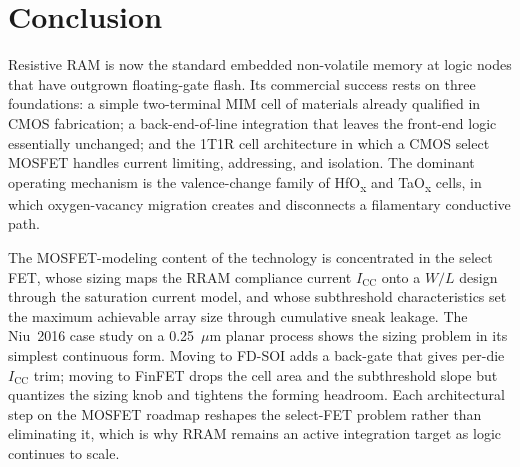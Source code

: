 \documentclass[lettersize,journal]{IEEEtran}
\begin{document}
\section{Conclusion}\label{sec:conclusion}
Resistive RAM is now the standard embedded non-volatile memory at logic nodes that have outgrown floating-gate flash. Its commercial success rests on three foundations: a simple two-terminal MIM cell of materials already qualified in CMOS fabrication; a back-end-of-line integration that leaves the front-end logic essentially unchanged; and the 1T1R cell architecture in which a CMOS select MOSFET handles current limiting, addressing, and isolation. The dominant operating mechanism is the valence-change family of HfO\textsubscript{x} and TaO\textsubscript{x} cells, in which oxygen-vacancy migration creates and disconnects a filamentary conductive path.

The MOSFET-modeling content of the technology is concentrated in the select FET, whose sizing maps the RRAM compliance current $I_\mathrm{CC}$ onto a $W/L$ design through the saturation current model, and whose subthreshold characteristics set the maximum achievable array size through cumulative sneak leakage. The Niu~2016 case study on a 0.25~$\mu$m planar process shows the sizing problem in its simplest continuous form. Moving to FD-SOI adds a back-gate that gives per-die $I_\mathrm{CC}$ trim; moving to FinFET drops the cell area and the subthreshold slope but quantizes the sizing knob and tightens the forming headroom. Each architectural step on the MOSFET roadmap reshapes the select-FET problem rather than eliminating it, which is why RRAM remains an active integration target as logic continues to scale.
\end{document}
